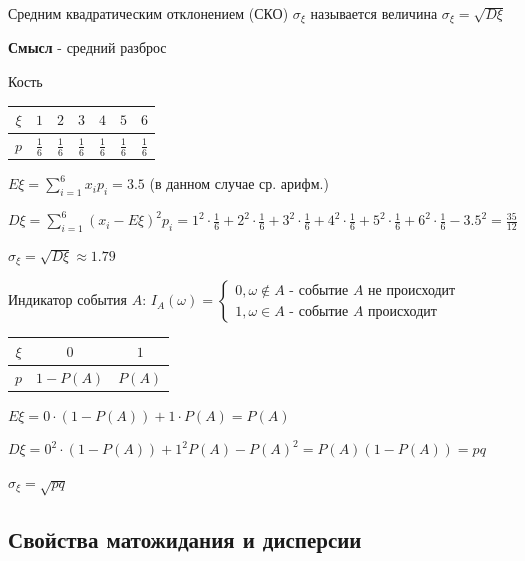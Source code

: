 \documentclass[12pt]{article}
\begin{document}
    \Defs Средним квадратическим отклонением (СКО) $\sigma_\xi$ называется величина $\sigma_\xi = \sqrt{D\xi}$

    \textbf{Смысл} - средний разброс

     Кость

    \smallvspace


    \begin{tabular}{c|c|c|c|c|c|c}
        $\xi$ & $1$           & $2$           & $3$           & $4$           & $5$           & $6$           \\
        \hline
        $p$   & $\frac{1}{6}$ & $\frac{1}{6}$ & $\frac{1}{6}$ & $\frac{1}{6}$ & $\frac{1}{6}$ & $\frac{1}{6}$
    \end{tabular}


    $E\xi = \sum_{i = 1}^6 x_i p_i = 3.5$ (в данном случае ср. арифм.)

    $D\xi = \sum_{i = 1}^6 (x_i - E\xi)^2 p_i = 1^2 \cdot \frac{1}{6} + 2^2 \cdot \frac{1}{6} + 3^2 \cdot \frac{1}{6} + 4^2 \cdot \frac{1}{6} + 5^2 \cdot \frac{1}{6} + 6^2 \cdot \frac{1}{6} - 3.5^2 = \frac{35}{12} $

    $\sigma_\xi = \sqrt{D\xi} \approx 1.79$

     Индикатор события $A$: $I_A (\omega) = \begin{cases}
                                                       0, \omega \notin A \text{ - событие } A \text{ не происходит} \\ 1, \omega \in A \text{ - событие } A \text{ происходит}
    \end{cases}$

    \begin{tabular}{c|c|c}
        $\xi$ & $0$        & $1$    \\
        \hline
        $p$   & $1 - P(A)$ & $P(A)$
    \end{tabular}

    $E\xi = 0 \cdot (1 - P(A)) + 1 \cdot P(A) = P(A)$

    $D\xi = 0^2 \cdot (1 - P(A)) + 1^2 P(A) - P(A)^2 = P(A) (1 - P(A)) = pq$

    $\sigma_\xi = \sqrt{pq}$

    \hypertarget{expectedvalueandvarianceproperties}{}

    \subsection{Свойства матожидания и дисперсии}
\end{document}

